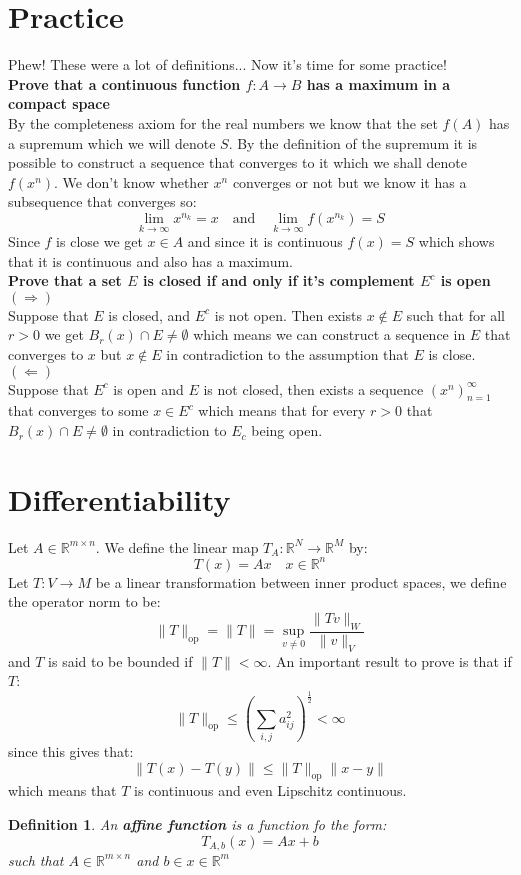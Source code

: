 \documentclass[11pt,a4paper]{article}
\theoremstyle{plain}
\newtheorem{definition}{Definition}[section]
\newcommand{\R}{\mathbb{R}}
\begin{document}
	\section{Practice}
	Phew! These were a lot of definitions... Now it's time for some practice!
	\\ \textbf{Prove that a continuous function $f\colon A\to B$ has 
	a maximum in a compact space} \\
	By the completeness axiom for the real numbers we know that the set
	$f(A)$ has a supremum which we will denote $S$. By the definition
	of the supremum it is possible to construct a sequence that converges
	to it which we shall denote $f(x^n)$. We don't know whether $x^n$
	converges or not but we know it has a subsequence that converges so:
	\[
		\lim_{k\to\infty}{x^{n_k}} = x \quad \text{and} \quad 
		\lim_{k\to\infty}{f(x^{n_k})} = S
	\]
	Since $f$ is close we get $x\in A$ and since it is continuous $f(x) = S$
	which shows that it is continuous and also has a maximum. \\
	\textbf{Prove that a set $E$ is closed if and only if it's complement
	$E^c$ is open} \\
	\underline{$(\Rightarrow)$} \\
	Suppose that $E$ is closed, and $E^c$ is not open. Then exists
	$x\notin E$ such that for all $r > 0$ we get $B_r(x) \cap E \neq 
	\emptyset$ which means we can construct a sequence in $E$ that converges
	to $x$ but $x\notin E$ in contradiction to the assumption that $E$ is 
	close. \\
	\underline{$(\Leftarrow)$} \\
	Suppose that $E^c$ is open and $E$ is not closed, then exists a sequence
	$(x^n)_{n=1}^{\infty}$ that converges to some $x \in E^c$ which means
	that for every $r > 0$ that $B_r(x) \cap E \neq \emptyset$ in 
	contradiction to $E_c$ being open.
	
	\newpage
	
	\section{Differentiability}
	Let $A \in \R^{m \times n}$. We define the linear map 
	$T_A \colon \R^N \to \R^M$ by:
	\[
		T(x) = Ax \quad x\in \R^n
	\]
	Let $T \colon V \to M$ be a linear transformation between inner product
	spaces, we define the operator norm to be:
	\[
		\|T\|_{\mathrm{op}} = \|T\| = \sup_{v \neq 0}{\frac{\|Tv\|_W}{\|v\|_V}}
	\]
	and $T$ is said to be bounded if $\|T\| < \infty$. An important result
	to prove is that if $T$:
	\[
		\|T\|_{\mathrm{op}} \le 
		\left(\sum_{i,j}{}a_{ij}^{2}\right)^{\frac{1}{2}} < \infty
	\]
	since this gives that:
	\[
		\|T(x) - T(y)\| \le \|T\|_{\mathrm{op}}\|x-y\|
	\]
	which means that $T$ is continuous and even Lipschitz continuous.
	\begin{definition}
	An \textbf{affine function} is a function fo the form:
	\[
		T_{A,b}(x) = Ax + b
	\]
	such that $A\in\R^{m \times n}$ and $b\in x\in \R^{m}$ 
	\end{definition}
	
	
	
	
\end{document}
